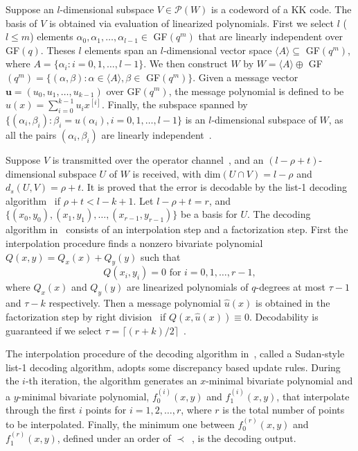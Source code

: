 \documentclass[11pt,onecolumn,draftcls]{IEEEtran}
\begin{document}
Suppose an $l$-dimensional subspace $V\in \mathcal{P}(W)$ is a codeword of a KK code. The basis of $V$ is obtained via evaluation of linearized polynomials. First we select $l$ ($l \le m$) elements $\alpha_0, \alpha_1, \ldots, \alpha_{l - 1} \in$ GF$(q^m)$ that are linearly independent over GF$(q)$. Theses $l$ elements span an $l$-dimensional vector space $\langle A \rangle \subseteq$ GF$(q^m)$, where $A = \{\alpha_i: i = 0, 1, \ldots, l -1\}$. We then construct $W$ by $W = \langle A \rangle \oplus$ GF$(q^m) = \{(\alpha, \beta): \alpha \in \langle A \rangle, \beta \in$ GF$(q^m)\}$. Given a message vector $\mathbf{u} = (u_0, u_1, \ldots, u_{k-1})$ over GF$(q^m)$, the message polynomial is defined to be $u(x) = \sum_{i = 0}^{k-1} u_i x^{[i]}$. Finally, the subspace spanned by $\{(\alpha_i, \beta_i): \beta_i = u(\alpha_i), i = 0, 1, \ldots, l-1\}$ is an $l$-dimensional subspace of $W$, as all the pairs $(\alpha_i, \beta_i)$ are linearly independent~\cite{kotter_it08}.

Suppose $V$ is transmitted over the operator channel~\cite{kotter_it08}, and an $(l-\rho + t)$-dimensional subspace $U$ of $W$ is received, with dim$(U \cap V) = l - \rho$ and $d_s(U, V) = \rho + t$. It is proved that the error is decodable by the list-1 decoding algorithm~\cite{kotter_it08} if $\rho + t < l - k + 1$.
Let $l - \rho + t = r$, and $\{(x_0, y_0), (x_1, y_1), \ldots, (x_{r-1}, y_{r-1})\}$ be a basis for $U$. The decoding algorithm in~\cite{kotter_it08} consists of an interpolation step and a factorization step. First the interpolation procedure finds a nonzero bivariate polynomial $Q(x, y)= Q_x(x) + Q_y(y)$ such that
\begin{equation} \label{equ: KKinterpolation}
Q(x_i, y_i) = 0 \textrm{ for } i = 0, 1, \ldots, r-1,
\end{equation}
where $Q_x(x)$ and $Q_y(y)$ are linearized polynomials of $q$-degrees at most $\tau - 1$ and $\tau - k$ respectively. Then a message polynomial $\hat{u}(x)$ is obtained in the factorization step by right division~\cite{kotter_it08} if $Q(x, \hat{u}(x)) \equiv 0$. Decodability is guaranteed if we select $\tau = \lceil (r + k) /2 \rceil$~\cite{kotter_it08}.

The interpolation procedure of the decoding algorithm in~\cite{kotter_it08}, called  a Sudan-style list-1 decoding algorithm,  adopts some discrepancy based update rules. During the $i$-th iteration, the algorithm generates an $x$-minimal bivariate polynomial and a $y$-minimal bivariate polynomial, $f_0^{(i)}(x,y)$ and $f_1^{(i)}(x,y)$, that interpolate through the first $i$ points for $i=1,2,\ldots, r$, where $r$ is the total number of points to be interpolated. Finally, the minimum one between $f_0^{(r)}(x,y)$ and $f_1^{(r)}(x,y)$, defined under an order of $\prec$~\cite{kotter_it08}, is the decoding output.
\end{document}
